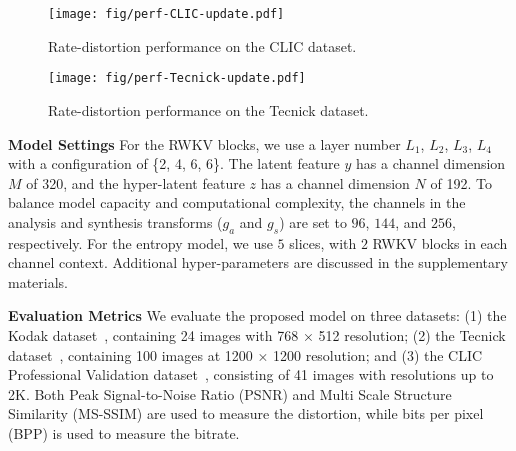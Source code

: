 \begin{figure*}[htbp]
    \centering
    \begin{minipage}{0.48\linewidth}
        \centering
        \texttt{[image: fig/perf-CLIC-update.pdf]}
        \caption{Rate-distortion performance on the CLIC dataset.}
        \label{fig:perf-clic}
    \end{minipage}
    \hfill
    \begin{minipage}{0.48\linewidth}
        \centering
        \texttt{[image: fig/perf-Tecnick-update.pdf]}
        \caption{Rate-distortion performance on the Tecnick dataset.}
        \label{fig:perf-tecnick}
    \end{minipage}
\end{figure*}




\noindent\textbf{Model Settings} \;
For the RWKV blocks, we use a layer number $L_1$, $L_2$, $L_3$, $L_4$ with a configuration of \{2, 4, 6, 6\}. The latent feature \( y \) has a channel dimension \( M \) of 320, and the hyper-latent feature \( z \) has a channel dimension \( N \) of 192. To balance model capacity and computational complexity, the channels in the analysis and synthesis transforms (\(g_a\) and \(g_s\)) are set to $96$, $144$, and $256$, respectively. For the entropy model, we use $5$ slices, with $2$ RWKV blocks in each channel context. Additional hyper-parameters are discussed in the supplementary materials. 

\noindent\textbf{Evaluation Metrics} \;
We evaluate the proposed model on three datasets: (1) the Kodak dataset~\cite{Kodak.1993.Lossless}, containing 24 images with 768 × 512 resolution; (2) the Tecnick dataset~\cite{Asuni.2014.Tecnick}, containing 100 images at 1200 × 1200 resolution; and (3) the CLIC Professional Validation dataset~\cite{CLIC.2021.Workshop}, consisting of 41 images with resolutions up to 2K. Both Peak Signal-to-Noise Ratio (PSNR) and Multi Scale Structure Similarity (MS-SSIM) are used to measure the distortion, while bits per pixel (BPP) is used to measure the bitrate.

